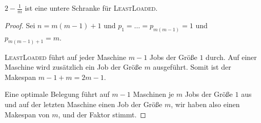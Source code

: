 \documentclass[language=ngerman,algolist]{TemplateLecture}
\begin{document}
\begin{rmk}
    $2-\frac{1}{m}$ ist eine untere Schranke für \textsc{LeastLoaded}.
    \begin{proof}
        Sei $n = m(m-1) + 1$ und $p_1 = \dots = p_{m(m-1)} = 1$ und $p_{m(m-1)+1} = m$. 

        \textsc{LeastLoaded} führt auf jeder Maschine $m-1$ Jobs der Größe $1$ durch. Auf einer Maschine wird zusätzlich ein Job der Größe $m$ ausgeführt. Somit ist der Makespan $m-1+m = 2m-1$.

        Eine optimale Belegung führt auf $m-1$ Maschinen je $m$ Jobs der Größe $1$ aus und auf der letzten Maschine einen Job der Größe $m$, wir haben also einen Makespan von $m$, und der Faktor stimmt.
    \end{proof}
\end{rmk}
\end{document}
